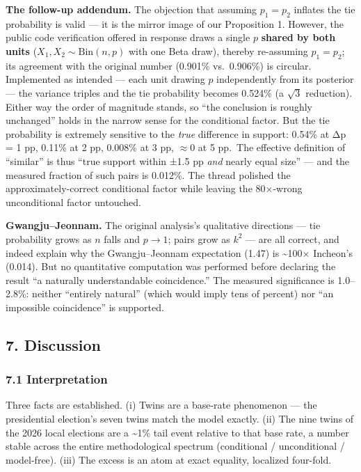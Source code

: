 \documentclass[
  11pt,
]{article}
\begin{document}
\textbf{The follow-up addendum.} The objection that assuming
\(p_1 = p_2\) inflates the tie probability is valid --- it is the mirror
image of our Proposition 1. However, the public code verification
offered in response draws a single \(p\) \textbf{shared by both units}
(\(X_1, X_2 \sim \mathrm{Bin}(n, p)\) with one Beta draw), thereby
re-assuming \(p_1 = p_2\); its agreement with the original number
(0.901\% vs.~0.906\%) is circular. Implemented as intended --- each unit
drawing \(p\) independently from its posterior --- the variance triples
and the tie probability becomes 0.524\% (a \(\sqrt{3}\) reduction).
Either way the order of magnitude stands, so ``the conclusion is roughly
unchanged'' holds in the narrow sense for the conditional factor. But
the tie probability is extremely sensitive to the \emph{true} difference
in support: 0.54\% at Δp = 1 pp, 0.11\% at 2 pp, 0.008\% at 3 pp,
\(\approx 0\) at 5 pp.~The effective definition of ``similar'' is thus
``true support within ±1.5 pp \emph{and} nearly equal size'' --- and the
measured fraction of such pairs is 0.012\%. The thread polished the
approximately-correct conditional factor while leaving the 80×-wrong
unconditional factor untouched.

\textbf{Gwangju--Jeonnam.} The original analysis's qualitative
directions --- tie probability grows as \(n\) falls and \(p \to 1\);
pairs grow as \(k^2\) --- are all correct, and indeed explain why the
Gwangju--Jeonnam expectation (1.47) is \textasciitilde100× Incheon's
(0.014). But no quantitative computation was performed before declaring
the result ``a naturally understandable coincidence.'' The measured
significance is 1.0--2.8\%: neither ``entirely natural'' (which would
imply tens of percent) nor ``an impossible coincidence'' is supported.

\subsection{7. Discussion}\label{discussion}

\subsubsection{7.1 Interpretation}\label{interpretation}

Three facts are established. (i) Twins are a base-rate phenomenon ---
the presidential election's seven twins match the model exactly. (ii)
The nine twins of the 2026 local elections are a \textasciitilde1\% tail
event relative to that base rate, a number stable across the entire
methodological spectrum (conditional / unconditional / model-free).
(iii) The excess is an atom at exact equality, localized four-fold.
\end{document}

